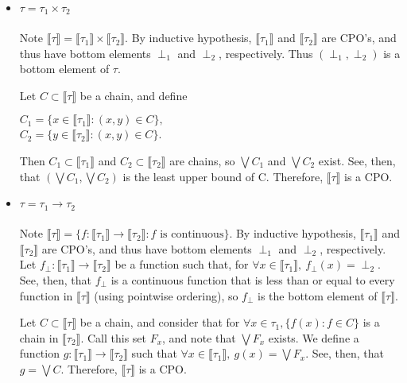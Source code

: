 \documentclass{westhesis}
\begin{document}
\begin{itemize}
\item $\tau = \tau_1 \times \tau_2$ \\ \\
Note $\llbracket \tau \rrbracket = \llbracket \tau_1 \rrbracket \times \llbracket \tau_2 \rrbracket$. By inductive hypothesis,
$\llbracket \tau_1 \rrbracket$ and $\llbracket \tau_2 \rrbracket$ are CPO's, and thus have bottom elements $\perp_1$ and $
\perp_2$, respectively. Thus $(\perp_1, \perp_2)$ is a bottom element of $\tau$. 

Let $C \subset \llbracket \tau \rrbracket$ be a
chain, and define
\begin{center}
$C_1 = \{x \in \llbracket \tau_1 \rrbracket : (x,y) \in C\},$ \\
$C_2 = \{ y \in \llbracket \tau_2 \rrbracket: (x,y) \in C\}$. \\ 
\end{center}
Then $C_1 \subset \llbracket \tau_1 \rrbracket$ and $C_2 \subset \llbracket \tau_2 \rrbracket$ are chains, so $\bigvee C_1$
and $\bigvee C_2$ exist. See, then, that $(\bigvee C_1, \bigvee C_2)$ is the least upper bound of C. Therefore, $\llbracket 
\tau \rrbracket$ is a CPO.
\item $\tau = \tau_1 \rightarrow \tau_2$ \\ \\
Note $\llbracket \tau \rrbracket = \{f : \llbracket \tau_1 \rrbracket \rightarrow \llbracket \tau_2 \rrbracket : f \text{ is continuous}\}
$. By inductive hypothesis, $\llbracket \tau_1 \rrbracket$ and $\llbracket \tau_2 \rrbracket$ are CPO's, and thus have bottom
elements $\perp_1$ and $\perp_2$, respectively. Let $f_{\perp}: \llbracket \tau_1 \rrbracket \rightarrow \llbracket \tau_2 
\rrbracket$ be a function such that, for $\forall x \in \llbracket \tau_1 \rrbracket, \ f_{\perp}(x) = \perp_2$. See, then, that 
$f_{\perp}$ is a continuous function that is less than or equal to every function in $\llbracket \tau \rrbracket$ (using pointwise
ordering), so $f_{\perp}$ is the bottom element of $\llbracket \tau \rrbracket$.  

Let $C \subset \llbracket \tau \rrbracket$ be a 
chain, and consider that for $\forall x \in \tau_1, \{f(x) : f \in C\}$ is a chain in $\llbracket \tau_2 \rrbracket$. Call this set $F_x$,
and note that $\bigvee F_x$ exists. We define a function $g: \llbracket \tau_1 \rrbracket \rightarrow \llbracket \tau_2 \rrbracket$ 
such that $\forall x \in \llbracket \tau_1 \rrbracket, \ g(x) = \bigvee F_x$. See, then, that $g = \bigvee C$. Therefore, $\llbracket
\tau \rrbracket$ is a CPO. \\
\end{itemize} 
\end{document}

